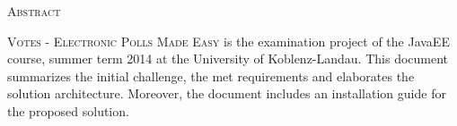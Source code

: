 \vspace*{\fill}
\begin{center}
{\huge \textsc{Abstract}}
\\ \vspace*{7mm}
\begin{minipage}[m]{0.9\textwidth}
\large
\textsc{Votes - Electronic Polls Made Easy} is the examination project of the JavaEE course, summer term 2014 at the University of Koblenz-Landau.
This document summarizes the initial challenge, the met requirements and elaborates the solution architecture.
Moreover, the document includes an installation guide for the proposed solution.
\end{minipage}
\end{center}
\vspace*{\fill}